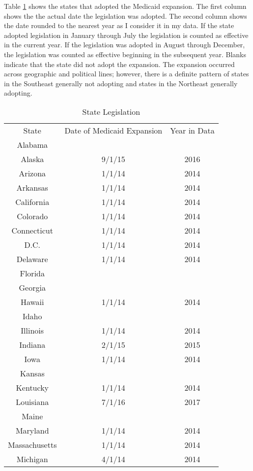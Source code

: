 \documentclass[11pt]{article}
\begin{document}
Table \ref{State Legislation} shows the states that adopted the Medicaid expansion.  The first column shows the the actual date the legislation was adopted.  The second column shows the date rounded to the nearest year as I consider it in my data. If the state adopted legislation in January through July the legislation is counted as effective in the current year.  If the legislation was adopted in August through December, the legislation was counted as effective beginning in the subsequent year. Blanks indicate that the state did not adopt the expansion. The expansion occurred across geographic and political lines; however, there is a definite pattern of states in the Southeast generally not adopting and states in the Northeast generally adopting.   

\cleardoublepage

\begin{table}
\centering
\scriptsize
\caption{State Legislation} 
\label{State Legislation}
\begin{tabular}{ccc}
\hline \hline
 State & Date of Medicaid Expansion & Year in Data\\
 Alabama & &\\
 Alaska & 9/1/15 & 2016\\
 Arizona &1/1/14 & 2014\\
 Arkansas &1/1/14 & 2014\\
 California & 1/1/14 & 2014\\
 Colorado &1/1/14 & 2014\\
 Connecticut &1/1/14 & 2014\\
 D.C. &1/1/14 & 2014\\
 Delaware &1/1/14 & 2014\\
 Florida & &\\
 Georgia &&\\
 Hawaii &1/1/14 & 2014\\
 Idaho &&\\
 Illinois & 1/1/14 & 2014\\
 Indiana & 2/1/15 & 2015\\
 Iowa & 1/1/14 & 2014\\
 Kansas &&\\
 Kentucky & 1/1/14 & 2014\\
 Louisiana & 7/1/16 & 2017\\
 Maine &&\\
 Maryland & 1/1/14 & 2014\\
 Massachusetts & 1/1/14 & 2014\\
 Michigan & 4/1/14 &2014\\

\end{tabular}
\end{table}
\end{document}
